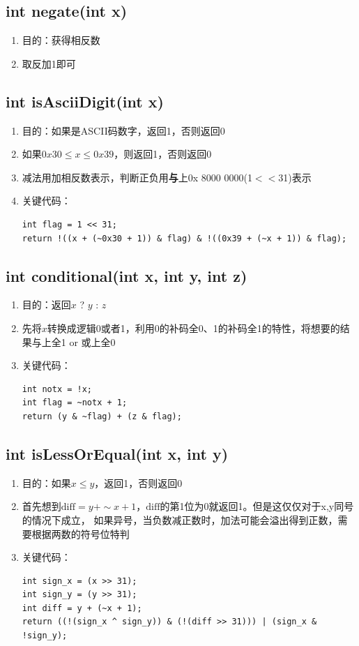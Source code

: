 \documentclass[12pt, a4paper, oneside]{ctexart}
\begin{document}
\subsection{int negate(int x)}
\begin{enumerate}
    \item 目的：获得相反数
    \item 取反加1即可
\end{enumerate}
\subsection{int isAsciiDigit(int x)}
\begin{enumerate}
    \item 目的：如果是ASCII码数字，返回1，否则返回0
    \item 如果$0x30 \le x \le 0x39$，则返回1，否则返回0
    \item 减法用加相反数表示，判断正负用\textbf{与}上0x 8000 0000(1$<<$31)表示
    \item 关键代码：
\begin{lstlisting}
int flag = 1 << 31;
return !((x + (~0x30 + 1)) & flag) & !((0x39 + (~x + 1)) & flag);
\end{lstlisting}
\end{enumerate}
\subsection{int conditional(int x, int y, int z)}
\begin{enumerate}
    \item 目的：返回$x$ ? $y$ : $z$
    \item 先将$x$转换成逻辑0或者1，利用0的补码全0、1的补码全1的特性，将想要的结果与上全1 or 或上全0
    \item 关键代码：
\begin{lstlisting}
int notx = !x;
int flag = ~notx + 1;
return (y & ~flag) + (z & flag);
\end{lstlisting}
\end{enumerate}
\subsection{int isLessOrEqual(int x, int y)}
\begin{enumerate}
    \item 目的：如果$x \le y$，返回1，否则返回0
    \item 首先想到$\mathrm{diff} = y + \sim x + 1$，$\mathrm{diff}$的第1位为0就返回1。但是这仅仅对于x,y同号的情况下成立，
          如果异号，当负数减正数时，加法可能会溢出得到正数，需要根据两数的符号位特判
    \item 关键代码：
\begin{lstlisting}
int sign_x = (x >> 31); 
int sign_y = (y >> 31);
int diff = y + (~x + 1);
return ((!(sign_x ^ sign_y)) & (!(diff >> 31))) | (sign_x & !sign_y);  
\end{lstlisting}
\end{enumerate}
\end{document}
